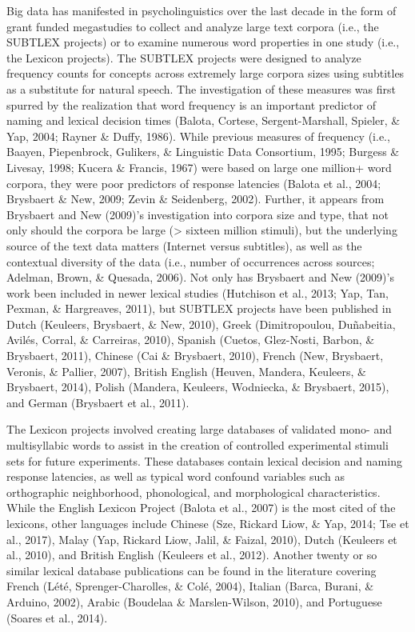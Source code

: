 \documentclass[english,man]{apa6}
\theoremstyle{definition}
\theoremstyle{definition}
\theoremstyle{definition}
\theoremstyle{remark}
\begin{document}
Big data has manifested in psycholinguistics over the last decade in the
form of grant funded megastudies to collect and analyze large text
corpora (i.e., the SUBTLEX projects) or to examine numerous word
properties in one study (i.e., the Lexicon projects). The SUBTLEX
projects were designed to analyze frequency counts for concepts across
extremely large corpora sizes using subtitles as a substitute for
natural speech. The investigation of these measures was first spurred by
the realization that word frequency is an important predictor of naming
and lexical decision times (Balota, Cortese, Sergent-Marshall, Spieler,
\& Yap, 2004; Rayner \& Duffy, 1986). While previous measures of
frequency (i.e., Baayen, Piepenbrock, Gulikers, \& Linguistic Data
Consortium, 1995; Burgess \& Livesay, 1998; Kucera \& Francis, 1967)
were based on large one million+ word corpora, they were poor predictors
of response latencies (Balota et al., 2004; Brysbaert \& New, 2009;
Zevin \& Seidenberg, 2002). Further, it appears from Brysbaert and New
(2009)'s investigation into corpora size and type, that not only should
the corpora be large (\textgreater{} sixteen million stimuli), but the
underlying source of the text data matters (Internet versus subtitles),
as well as the contextual diversity of the data (i.e., number of
occurrences across sources; Adelman, Brown, \& Quesada, 2006). Not only
has Brysbaert and New (2009)'s work been included in newer lexical
studies (Hutchison et al., 2013; Yap, Tan, Pexman, \& Hargreaves, 2011),
but SUBTLEX projects have been published in Dutch (Keuleers, Brysbaert,
\& New, 2010), Greek (Dimitropoulou, Duñabeitia, Avilés, Corral, \&
Carreiras, 2010), Spanish (Cuetos, Glez-Nosti, Barbon, \& Brysbaert,
2011), Chinese (Cai \& Brysbaert, 2010), French (New, Brysbaert,
Veronis, \& Pallier, 2007), British English (Heuven, Mandera, Keuleers,
\& Brysbaert, 2014), Polish (Mandera, Keuleers, Wodniecka, \& Brysbaert,
2015), and German (Brysbaert et al., 2011).

The Lexicon projects involved creating large databases of validated
mono- and multisyllabic words to assist in the creation of controlled
experimental stimuli sets for future experiments. These databases
contain lexical decision and naming response latencies, as well as
typical word confound variables such as orthographic neighborhood,
phonological, and morphological characteristics. While the English
Lexicon Project (Balota et al., 2007) is the most cited of the lexicons,
other languages include Chinese (Sze, Rickard Liow, \& Yap, 2014; Tse et
al., 2017), Malay (Yap, Rickard Liow, Jalil, \& Faizal, 2010), Dutch
(Keuleers et al., 2010), and British English (Keuleers et al., 2012).
Another twenty or so similar lexical database publications can be found
in the literature covering French (Lété, Sprenger-Charolles, \& Colé,
2004), Italian (Barca, Burani, \& Arduino, 2002), Arabic (Boudelaa \&
Marslen-Wilson, 2010), and Portuguese (Soares et al., 2014).
\end{document}
